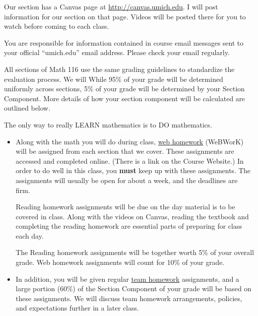 \documentclass[11pt,twoside]{article}
\newcommand\topic[1]{\noindent{\bf #1}}
\begin{document}
\vspace{5pt}

\noindent Our section has a Canvas page at \url{http://canvas.umich.edu}. I will post information for our section on that page.  Videos will be posted there for you to watch before coming to each class.  %


\vspace{5pt}

\topic{Email:} You are responsible for information contained in course email messages sent to your official ``umich.edu'' email address.  Please check your email regularly.

\vspace{5pt}
\topic{\bf Grading Policy:}  All sections of Math 116 use the same grading guidelines to standardize the evaluation process. %
We will While 95\% of your grade will be determined uniformly across sections, 5\% of your grade will be determined by your Section Component. More details of how your section component will be calculated are outlined below. 

\vspace{5pt}

\topic{Homework:}   The only way to really LEARN mathematics is to DO mathematics.
  \vspace{-2ex}

 \begin{itemize}
 \item Along with the math you will do during class, 
 \underline{web homework} (WeBWorK) will be assigned from each section that we cover.  These assignments are accessed and completed online.  (There is a link on the Course Website.)  In order to do well in this class, you {\bf must} keep up with these assignments.   The assignments will usually be open for about a week, and the deadlines are firm. 
 
Reading homework assignments will be due on the day material is to be covered in class. Along with the videos on Canvas, reading the textbook and completing the reading homework are essential parts of preparing for class each day. 

The Reading homework assignments will be together worth 5\% of your overall grade. Web homework assignments will count for 10\% of your grade.   %
  \vspace{-1ex}


\item In addition, you will be given regular \underline{team homework} assignments, and a large portion (60\%) of the Section Component of your grade will be based on these assignments. We will discuss team homework arrangements, policies, and expectations further in a later class. %
\end{itemize}
\end{document}
